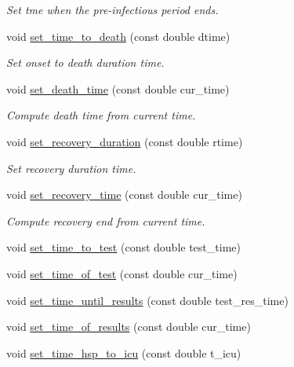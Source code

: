 \begin{DoxyCompactItemize}
\begin{DoxyCompactList}\small\item\em Set tme when the pre-\/infectious period ends. \end{DoxyCompactList}\item 
void \hyperlink{classAgent_aac1043948af7c46b29e2cc9e4e2d89ab}{set\+\_\+time\+\_\+to\+\_\+death} (const double dtime)
\begin{DoxyCompactList}\small\item\em Set onset to death duration time. \end{DoxyCompactList}\item 
void \hyperlink{classAgent_a1df245aa715f81813b853931db39a398}{set\+\_\+death\+\_\+time} (const double cur\+\_\+time)
\begin{DoxyCompactList}\small\item\em Compute death time from current time. \end{DoxyCompactList}\item 
void \hyperlink{classAgent_a98b8e5692686d71e154c65eb9290ce4b}{set\+\_\+recovery\+\_\+duration} (const double rtime)
\begin{DoxyCompactList}\small\item\em Set recovery duration time. \end{DoxyCompactList}\item 
void \hyperlink{classAgent_a451d3755209b898469cc459266b610a1}{set\+\_\+recovery\+\_\+time} (const double cur\+\_\+time)
\begin{DoxyCompactList}\small\item\em Compute recovery end from current time. \end{DoxyCompactList}\item 
void \hyperlink{classAgent_acedabbad82e3e566d07cb0f4a743db12}{set\+\_\+time\+\_\+to\+\_\+test} (const double test\+\_\+time)
\item 
void \hyperlink{classAgent_aef9c72b5c984f9c89df6f8e1a0ad166d}{set\+\_\+time\+\_\+of\+\_\+test} (const double cur\+\_\+time)
\item 
void \hyperlink{classAgent_a8f56c1c255e7bb89da56a694942ba863}{set\+\_\+time\+\_\+until\+\_\+results} (const double test\+\_\+res\+\_\+time)
\item 
void \hyperlink{classAgent_a7d07d44ee7fd59ddf82a0be09b5dcdf9}{set\+\_\+time\+\_\+of\+\_\+results} (const double cur\+\_\+time)
\item 
void \hyperlink{classAgent_a9fb25871c67a9f095438fdb0409f84e1}{set\+\_\+time\+\_\+hsp\+\_\+to\+\_\+icu} (const double t\+\_\+icu)

\end{DoxyCompactItemize}
